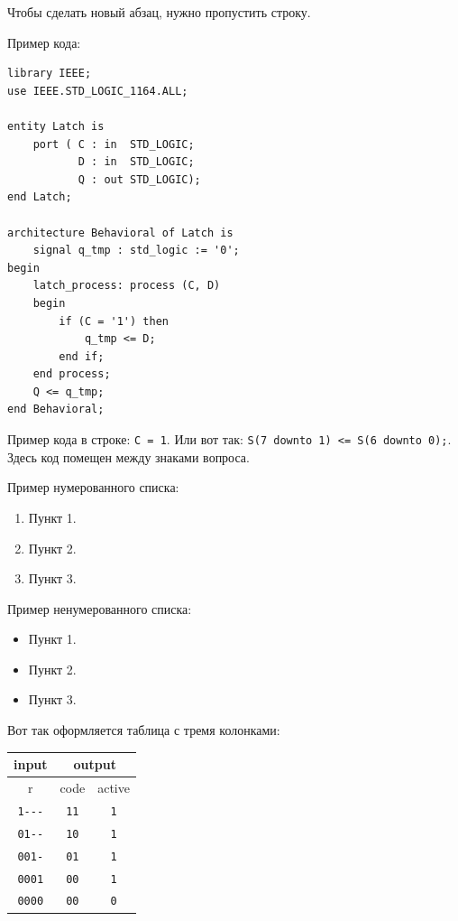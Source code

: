 Чтобы сделать новый абзац, нужно пропустить строку.

Пример кода:

\begin{Code}
\begin{lstlisting}
library IEEE;
use IEEE.STD_LOGIC_1164.ALL;

entity Latch is
    port ( C : in  STD_LOGIC;
           D : in  STD_LOGIC;
           Q : out STD_LOGIC);
end Latch;

architecture Behavioral of Latch is
    signal q_tmp : std_logic := '0';
begin
    latch_process: process (C, D)
    begin
        if (C = '1') then
            q_tmp <= D;
        end if;
    end process;
    Q <= q_tmp;
end Behavioral;
\end{lstlisting}
\end{Code}

Пример кода в строке: \lstinline?С = 1?. Или вот так: \lstinline?S(7 downto 1) <= S(6 downto 0);?. Здесь код помещен между знаками вопроса.

Пример нумерованного списка:

\begin{enumerate}
\item Пункт 1.
\item Пункт 2.
\item Пункт 3.
\end{enumerate}

Пример ненумерованного списка:

\begin{itemize}
\item Пункт 1.
\item Пункт 2.
\item Пункт 3.
\end{itemize}

Вот так оформляется таблица с тремя колонками:

\begin{table}[h]
\centering
\begin{tabular}{|c|c|c|}
\hline
input               & \multicolumn{2}{c|}{output} \\ \hline
r                   & code        & active         \\ \hline
\texttt{1{-}{-}{-}} & \texttt{11} & \texttt{1}     \\
\texttt{01{-}{-}}   & \texttt{10} & \texttt{1}     \\
\texttt{001-}       & \texttt{01} & \texttt{1}     \\
\texttt{0001}       & \texttt{00} & \texttt{1}     \\
\texttt{0000}       & \texttt{00} & \texttt{0}     \\
\hline
\end{tabular}
\end{table}

